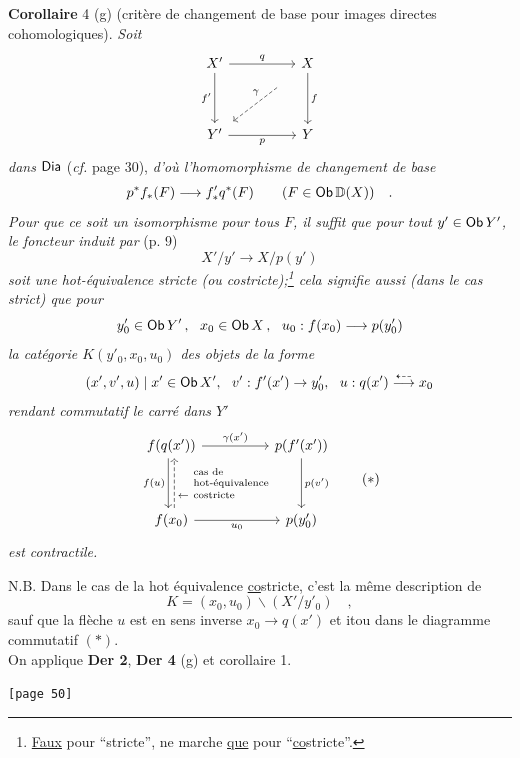 \noindent\textbf{Corollaire} 4 (g) (critère de changement de base pour images directes cohomologiques). \textit{Soit}
\[
\begin{tikzcd}[row sep=huge, column sep=huge]
X' \arrow[r, "q"] \arrow[d, "f'"'] & X \arrow[d, "f"] \arrow[dl, dashed, "\gamma"', shorten <=4ex, shorten >=1ex] \\
Y' \arrow[r, "p"'] & Y
\end{tikzcd}
\]
\textit{dans} $\mathsf{Dia}$ (\textit{cf.} page 30), \textit{d'où l'homomorphisme de changement de base}
\[ p^{*} f_{*}(F) \longrightarrow f'_{*} q^{*}(F) \qquad (F \in \mathsf{Ob}\,\mathbb{D}(X)) \quad . \]
\textit{Pour que ce soit un isomorphisme pour tous $F$, il suffit que pour tout $y' \in \mathsf{Ob}\,Y'$, le foncteur induit par} (p. 9)
\[ X'/y' \longrightarrow X/p(y') \]
\textit{soit une hot-équivalence stricte (ou costricte);\footnote[19]{\underline{Faux} pour “stricte”, ne marche \underline{que} pour “\underline{\underline{co}}stricte”.} cela signifie aussi (dans le cas strict) que pour}
\[ y'_{0} \in \Ob\,Y' \,,\ \ x_{0} \in \Ob\,X \,,\ \ u_{0} : f(x_{0}) \longrightarrow p(y'_{0}) \]
\textit{la catégorie $K(y'_{0}, x_{0}, u_{0})$ des objets de la forme}
\[ (x', v', u) \mid x' \in \mathsf{Ob}\,X',\ \ v' : f'(x') \to y'_{0},\ \ u : q(x') \overset{\dashleftarrow}{\longrightarrow} x_{0} \]
\textit{rendant commutatif le carré dans $Y'$}
\[
\begin{tikzcd}[row sep=huge, column sep=huge]
f(q(x')) \arrow[r, "\gamma(x')"] \arrow[d, shift right=0.5ex, "f(u)"'] & p(f'(x')) \arrow[d, "p(v')"] \\
f(x_{0}) \arrow[r, "u_{0}"'] \arrow[u, dashed, shift right=0.5ex, "\leftarrow\ \text{\scriptsize\shortstack[l]{cas de\\hot-équivalence\\costricte}}"'] & p(y'_{0})
\end{tikzcd}
\tag*{$(*)$}
\]
\textit{est contractile.}



\noindent N.B. Dans le cas de la hot équivalence \underline{co}stricte, c'est la même description de
\[ K = (x_{0}, u_{0})\backslash(X'/y'_{0}) \quad , \]
sauf que la flèche $u$ est en sens inverse $x_{0} \to q(x')$ et itou dans le diagramme commutatif $(*)$.\\
On applique \textbf{Der 2}, \textbf{Der 4} (g) et corollaire 1.

\noindent{}\texttt{[page 50]}

